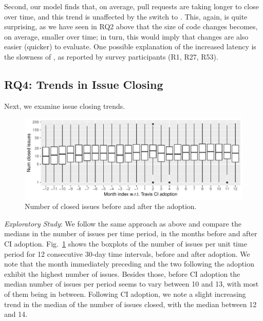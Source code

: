 Second, our model finds that, on average, pull requests are taking longer to close 
over time, and this trend is unaffected by the switch to \Tvis.
This, again, is quite surprising, as we have seen in RQ2 above that the size of 
code changes becomes, on average, smaller %
over time; in turn, this
would imply that changes are also easier (quicker) to evaluate.
One possible explanation of the increased latency is the %
slowness of \Tvi, 
as reported by survey participants (R1, R27, R53).


\subsection{RQ4: Trends in Issue Closing}

Next, we examine issue closing trends.

\begin{figure}[t]
\centering
\includegraphics[width=\columnwidth, clip=true, trim=0 0 0 0]{figures/issues-closed.pdf}
\caption{Number of closed issues before and after the \Tvis adoption.}
\label{fig:issues}\vspace{-0.4cm}
\end{figure}






%
%
%

\smallskip\noindent \emph{Exploratory Study}:
We follow the same approach as above and compare the 
medians in the number of issues per time period, in the months before and after CI adoption.
Fig.~\ref{fig:issues} shows the boxplots of the number of 
issues per unit time period for 12 consecutive 30-day time intervals, before and after \Tvis adoption.
We note that the month immediately preceding 
and the two following the adoption exhibit the highest number of issues.
Besides those, before CI adoption the median number of issues per period seems to vary between 10 and 13, with most of them being in between.
Following CI adoption, we note a slight increasing trend in the median of the number of issues closed, with the median between 12 and 14.

